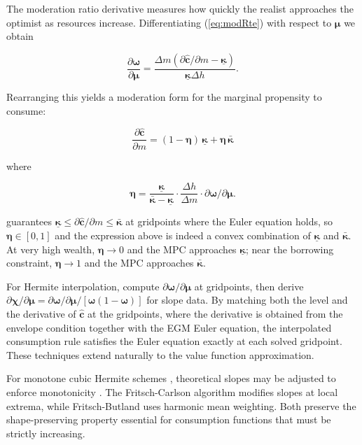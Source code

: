 \documentclass[preprint,authoryear]{elsarticle}
\newcommand{\hNrm}{h}
\newcommand{\MPC}{\boldsymbol{\kappa}}
\newcommand{\MPCmin}{\underline{\MPC}}
\newcommand{\MPCmax}{\bar{\MPC}}
\newcommand{\mNrm}{m}
\newcommand{\mNrmEx}{\Delta \mNrm}
\newcommand{\cFunc}{\mathbf{c}}
\newcommand{\cFuncReal}{\hat{\cFunc}}
\newcommand{\hNrmEx}{\Delta \hNrm}
\newcommand{\logmNrmEx}{\boldsymbol{\mu}}
\newcommand{\modRte}{\boldsymbol{\omega}}
\newcommand{\MPCmod}{\boldsymbol{\eta}}
\newcommand{\modRteMu}{\partial \modRte / \partial \logmNrmEx}
\newcommand{\logitModRte}{\boldsymbol{\chi}}
\newcommand{\logitModRteMu}{\partial \logitModRte / \partial \logmNrmEx}
\begin{document}
The moderation ratio derivative measures how quickly the realist approaches the optimist as resources increase.  Differentiating (\ref{eq:modRte}) with respect to $\logmNrmEx$ we obtain

\begin{equation}
\label{eq:modRteMu}
\frac{\partial \modRte}{\partial \logmNrmEx} = \frac{\mNrmEx (\partial \cFuncReal/\partial \mNrm - \MPCmin)}{\MPCmin \hNrmEx}.
\end{equation}

Rearranging this yields a moderation form for the marginal propensity to consume:

\begin{equation}
\label{eq:MPCModeration}
\frac{\partial \cFuncReal}{\partial \mNrm} = (1-\MPCmod)\,\MPCmin + \MPCmod\,\MPCmax
\end{equation}

where

\begin{equation}
\label{eq:MPCModerationWeight}
\MPCmod = \frac{\MPCmin}{\MPCmax-\MPCmin} \cdot \frac{\hNrmEx}{\mNrmEx} \cdot \partial \modRte / \partial \logmNrmEx.
\end{equation}

\citet{CarrollShanker2024} guarantees $\MPCmin \leq \partial \cFuncReal/\partial \mNrm \leq \MPCmax$ at gridpoints where the Euler equation holds, so $\MPCmod \in [0,1]$ and the expression above is indeed a convex combination of $\MPCmin$ and $\MPCmax$. At very high wealth, $\MPCmod \to 0$ and the MPC approaches $\MPCmin$; near the borrowing constraint, $\MPCmod \to 1$ and the MPC approaches $\MPCmax$.

For Hermite interpolation, compute $\modRteMu$ at gridpoints, then derive $\logitModRteMu = \modRteMu/[\modRte(1 -\modRte)]$ for slope data. By matching both the level and the derivative of $\cFuncReal$ at the gridpoints, where the derivative is obtained from the envelope condition \citep{BenvenisteScheinkman1979, MilgromSegal2002} together with the EGM Euler equation, the interpolated consumption rule satisfies the Euler equation exactly at each solved gridpoint. These techniques extend naturally to the value function approximation.

For monotone cubic Hermite schemes \citep{Fritsch1980, FritschButland1984, deBoor2001}, theoretical slopes may be adjusted to enforce monotonicity \citep{Hyman1983}. The Fritsch-Carlson algorithm modifies slopes at local extrema, while Fritsch-Butland uses harmonic mean weighting. Both preserve the shape-preserving property essential for consumption functions that must be strictly increasing.
\end{document}
